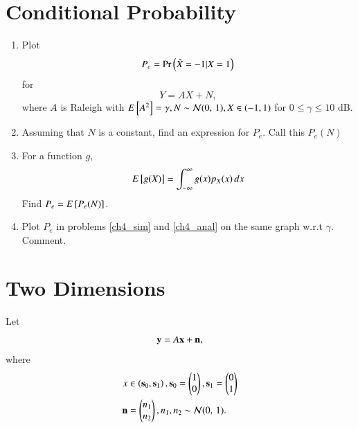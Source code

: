 \documentclass[journal,12pt,twocolumn]{IEEEtran}
\renewcommand\thesection{\arabic{section}}
\begin{document}
\section{Conditional Probability}
\begin{enumerate}[label=\thesection.\arabic*
,ref=\thesection.\theenumi]

\item
	\label{ch4_sim}
	Plot 
	\begin{equation}
	P_e = \Pr\left(\hat{X} = -1|X=1\right)
	\end{equation}
	for 
	\begin{equation}
	Y = AX+N,
	\end{equation}
	where $A$ is Raleigh with $E{}\left[A^2\right] = \gamma, N \sim \mathcal{N}(0,\,1), X \in \left(-1,1\right)$ for $0 \le \gamma \le 10$ dB.
	
\item
	Assuming that $N$ is a constant, find an expression for $P_e$.  Call this $P_e(N)$
	
\item
	\label{ch4_anal}
	For a function $g$,
	\begin{equation}
	E{}\left[g(X)\right] = \int_{-\infty}^{\infty}g(x)p_{X}(x)\, dx
	\end{equation}
	Find $P_e = E{}\left[P_e(N)\right]$.
	
\item
	Plot $P_e$ in problems \ref{ch4_sim} and \ref{ch4_anal} on the same graph w.r.t $\gamma$.  Comment.

\end{enumerate}

\section{Two Dimensions}
Let 
\begin{equation}
\mathbf{y} = A\mathbf{x} + \mathbf{n},
\end{equation}
where 
\begin{align}
x &\in \left(\mathbf{s}_0,\mathbf{s}_1\right), 
\mathbf{s}_0 = 
\begin{pmatrix}
1 
\\
0
\end{pmatrix},
\mathbf{s}_1 = 
\begin{pmatrix}
0 
\\
1
\end{pmatrix}
\\
\mathbf{n} &= 
\begin{pmatrix}
n_1
\\
n_2
\end{pmatrix},
n_1,n_2 \sim \mathcal{N}(0,\,1).
\end{align}
%
\end{document}
